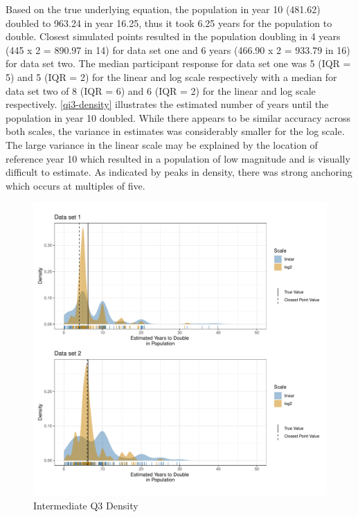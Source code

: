 \documentclass[print]{nuthesis}
\begin{document}
Based on the true underlying equation, the population in year 10 (481.62) doubled to 963.24 in year 16.25, thus it took 6.25 years for the population to double.
Closest simulated points resulted in the population doubling in 4 years (445 x 2 = 890.97 in 14) for data set one and 6 years (466.90 x 2 = 933.79 in 16) for data set two.
The median participant response for data set one was 5 (IQR = 5) and 5 (IQR = 2) for the linear and log scale respectively with a median for data set two of 8 (IQR = 6) and 6 (IQR = 2) for the linear and log scale respectively.
\cref{qi3-density} illustrates the estimated number of years until the population in year 10 doubled.
While there appears to be similar accuracy across both scales, the variance in estimates was considerably smaller for the log scale.
The large variance in the linear scale may be explained by the location of reference year 10 which resulted in a population of low magnitude and is visually difficult to estimate.
As indicated by peaks in density, there was strong anchoring which occurs at multiples of five.

\begin{figure}[tbp]

{\centering \includegraphics[width=1\linewidth,]{thesis_files/figure-latex/qi3-density-1} 

}

\caption{Intermediate Q3 Density}\label{fig:qi3-density}
\end{figure}
\end{document}
